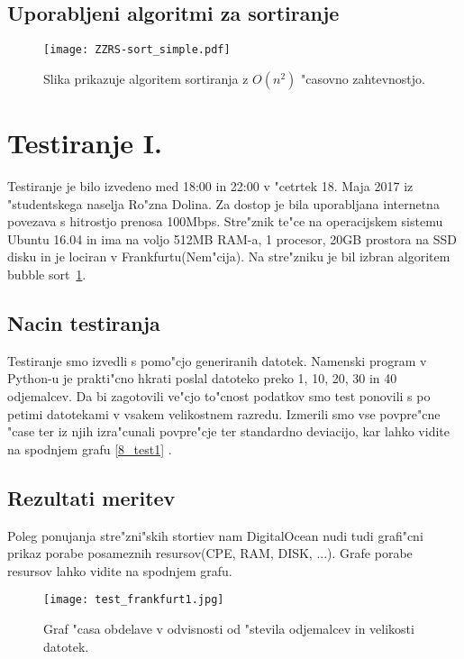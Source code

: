 \subsection{Uporabljeni algoritmi za sortiranje}
\begin{figure}
  \centering
    \texttt{[image: ZZRS-sort\_simple.pdf]}
  \caption{Slika prikazuje algoritem sortiranja z $O(n^2)$ "casovno zahtevnostjo.}
  \label{8_sort}  
\end{figure}

\section{Testiranje I. }
Testiranje je bilo izvedeno med 18:00 in 22:00 v "cetrtek 18. Maja 2017 iz "studentskega naselja Ro"zna Dolina. Za dostop je bila uporabljana internetna povezava s hitrostjo prenosa 100Mbps.
Stre"znik te"ce na operacijskem sistemu Ubuntu 16.04 in ima na voljo 512MB RAM-a, 1 procesor, 20GB prostora na SSD disku in je lociran v Frankfurtu(Nem"cija). Na stre"zniku je bil izbran algoritem bubble sort~\ref{8_sort}.

\subsection{Nacin testiranja}
Testiranje smo izvedli s pomo"cjo generiranih datotek. Namenski program v Python-u je prakti"cno hkrati poslal datoteko preko 1, 10, 20, 30 in 40 odjemalcev. Da bi zagotovili ve"cjo to"cnost podatkov smo test ponovili s po petimi datotekami v vsakem velikostnem razredu. 
Izmerili smo vse povpre"cne "case ter iz njih izra"cunali povpre"cje ter standardno deviacijo, kar lahko vidite na spodnjem grafu  \ref{8_test1} . 

\subsection{Rezultati meritev}
Poleg ponujanja stre"zni"skih stortiev nam DigitalOcean nudi tudi grafi"cni prikaz porabe posameznih resursov(CPE, RAM, DISK, ...).
Grafe porabe resursov lahko vidite na spodnjem grafu. 

\begin{figure}
  \centering
    \texttt{[image: test\_frankfurt1.jpg]}
  \caption{Graf "casa obdelave v odvisnosti od "stevila odjemalcev in velikosti datotek.}
  \label{8_graph_frankfurt1}
\end{figure}



